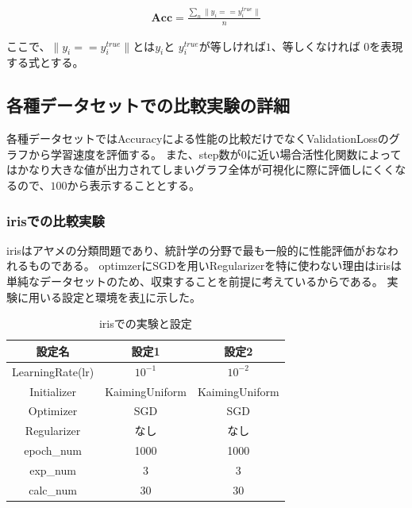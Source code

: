 \begin{eqnarray}
\mathbf{Acc} = \frac{\sum_n \|y_i == y_i^{true}\|}{n}
\label{eq:accuracy}
\end{eqnarray}

ここで、$ \|y_i == y_i^{true}\| $とは$ y_i $と $ y_i^{true} $が等しければ$ 1 $、等しくなければ $ 0 $を表現する式とする。

\subsection{各種データセットでの比較実験の詳細}

各種データセットではAccuracyによる性能の比較だけでなくValidationLossのグラフから学習速度を評価する。
また、step数が$0$に近い場合活性化関数によってはかなり大きな値が出力されてしまいグラフ全体が可視化に際に評価しにくくなるので、$100$から表示することとする。

\subsubsection{irisでの比較実験}
\label{impl:iris}

irisはアヤメの分類問題であり、統計学の分野で最も一般的に性能評価がおなわれるものである。
optimzerにSGDを用いRegularizerを特に使わない理由はirisは単純なデータセットのため、収束することを前提に考えているからである。
実験に用いる設定と環境を表\ref{exp:iris}に示した。


\begin{table}[htbp]
\label{exp:iris}
    \begin{center}
        \caption{irisでの実験と設定}
        \label{exp:iris}
        \vspace{2mm} 
        \begin{tabular}{ |c|c|c| }
        設定名 & 設定1 & 設定2 \\
        \hline
        LearningRate(lr)         & $ 10^{-1} $ & $ 10^{-2} $ \\
        Initializer       & KaimingUniform &  KaimingUniform \\
        Optimizer           & SGD & SGD \\
        Regularizer     & なし & なし \\
        epoch\_num       & 1000 &  1000 \\
        exp\_num         & 3 & 3 \\
        calc\_num        & 30 & 30 \\
        \end{tabular}
    \end{center}
\end{table}



